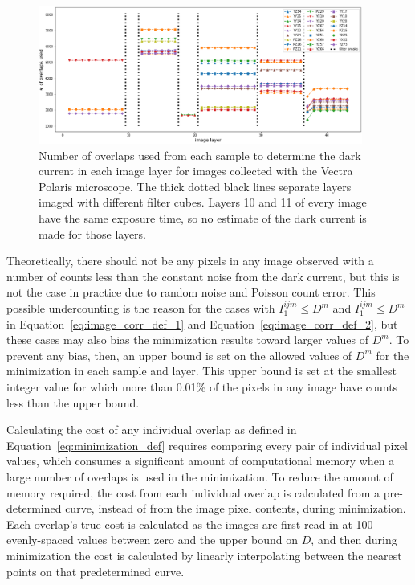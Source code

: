 \documentclass[letterpaper,11pt]{article}
\newcommand{\refeq}[1]{Equation~\ref{#1}}
\begin{document}
\begin{figure}[!ht]
\centering
\includegraphics[width=0.95\textwidth]{images/methods/n_overlaps_used_polaris}
\caption{\footnotesize Number of overlaps used from each sample to determine the dark current in each image layer for images collected with the Vectra Polaris microscope. The thick dotted black lines separate layers imaged with different filter cubes. Layers 10 and 11 of every image have the same exposure time, so no estimate of the dark current is made for those layers. }
\label{fig:n_overlaps_used_polaris}
\end{figure}

Theoretically, there should not be any pixels in any image observed with a number of counts less than the constant noise from the dark current, but this is not the case in practice due to random noise and Poisson count error. This possible undercounting is the reason for the cases with $I^{ijm}_{1} \leq D^{m}$ and $I^{ijm}_{1} \leq D^{m}$ in \refeq{eq:image_corr_def_1} and \refeq{eq:image_corr_def_2}, but these cases may also bias the minimization results toward larger values of $D^{m}$. To prevent any bias, then, an upper bound is set on the allowed values of $D^{m}$ for the minimization in each sample and layer. This upper bound is set at the smallest integer value for which more than 0.01\% of the pixels in any image have counts less than the upper bound.

Calculating the cost of any individual overlap as defined in \refeq{eq:minimization_def} requires comparing every pair of individual pixel values, which consumes a significant amount of computational memory when a large number of overlaps is used in the minimization. To reduce the amount of memory required, the cost from each individual overlap is calculated from a pre-determined curve, instead of from the image pixel contents, during minimization. Each overlap's true cost is calculated as the images are first read in at 100 evenly-spaced values between zero and the upper bound on $D$, and then during minimization the cost is calculated by linearly interpolating between the nearest points on that predetermined curve. 
\end{document}
